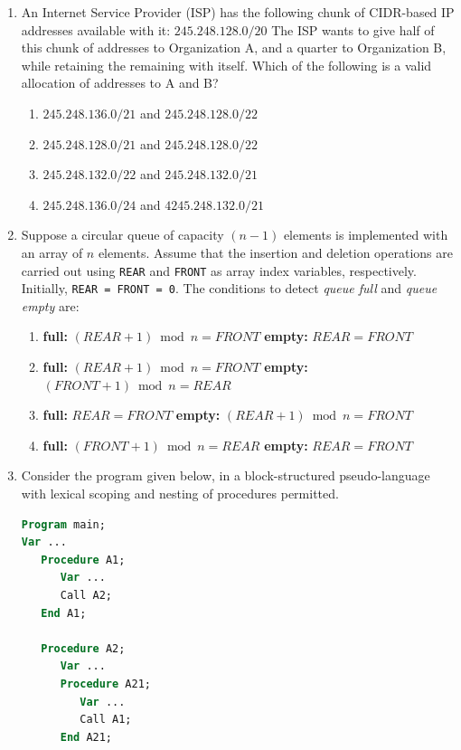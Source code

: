 \documentclass[journal]{IEEEtran}
\numberwithin{equation}{enumi}
\numberwithin{figure}{enumi}
\begin{document}
\begin{enumerate}
\item An Internet Service Provider (ISP) has the following chunk of CIDR-based IP addresses available with it:  
$245.248.128.0/20$ 
The ISP wants to give half of this chunk of addresses to Organization A, and a quarter to Organization B, while retaining the remaining with itself.  
Which of the following is a valid allocation of addresses to A and B?

\begin{enumerate}
    \item $245.248.136.0/21$ and $245.248.128.0/22$
    \item $245.248.128.0/21$ and $245.248.128.0/22$
    \item $245.248.132.0/22$ and $245.248.132.0/21$
    \item $245.248.136.0/24$ and $4245.248.132.0/21$
\end{enumerate}

\item Suppose a circular queue of capacity $(n-1)$ elements is implemented with an array of $n$ elements.  
Assume that the insertion and deletion operations are carried out using \texttt{REAR} and \texttt{FRONT} as array index variables, respectively.  
Initially, \texttt{REAR = FRONT = 0}.  
The conditions to detect \emph{queue full} and \emph{queue empty} are:

\begin{enumerate}
    \item \textbf{full:} $(REAR+1) \bmod n = FRONT$ 
          \textbf{empty:} $REAR = FRONT$
    \item \textbf{full:} $(REAR+1) \bmod n = FRONT$ 
          \textbf{empty:} $(FRONT+1) \bmod n = REAR$
    \item \textbf{full:} $REAR = FRONT$ 
          \textbf{empty:} $(REAR+1) \bmod n = FRONT$
    \item \textbf{full:} $(FRONT+1) \bmod n = REAR$ 
          \textbf{empty:} $REAR = FRONT$
\end{enumerate}

\item Consider the program given below, in a block-structured pseudo-language with lexical scoping and nesting of procedures permitted.

\begin{lstlisting}[language=Pascal]
Program main;
Var ...
   Procedure A1;
      Var ...
      Call A2;
   End A1;

   Procedure A2;
      Var ...
      Procedure A21;
         Var ...
         Call A1;
      End A21;


\end{lstlisting}
\end{enumerate}
\end{document}
